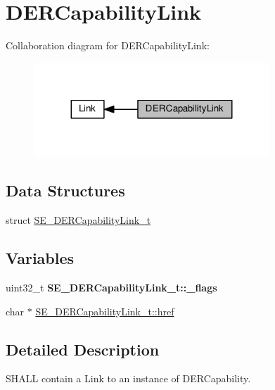 \hypertarget{group__DERCapabilityLink}{}\section{D\+E\+R\+Capability\+Link}
\label{group__DERCapabilityLink}
Collaboration diagram for D\+E\+R\+Capability\+Link\+:\nopagebreak
\begin{figure}[H]
\begin{center}
\leavevmode
\includegraphics[width=251pt]{group__DERCapabilityLink}
\end{center}
\end{figure}
\subsection*{Data Structures}
\begin{DoxyCompactItemize}
\item 
struct \hyperlink{structSE__DERCapabilityLink__t}{S\+E\+\_\+\+D\+E\+R\+Capability\+Link\+\_\+t}
\end{DoxyCompactItemize}
\subsection*{Variables}
\begin{DoxyCompactItemize}
\item 
\mbox{\label{group__DERCapabilityLink_gaea1b866e247ee0f3eb4085fe21918cc9}} 
uint32\+\_\+t {\bfseries S\+E\+\_\+\+D\+E\+R\+Capability\+Link\+\_\+t\+::\+\_\+flags}
\item 
char $\ast$ \hyperlink{group__DERCapabilityLink_ga70e58c8a8e494d1e297d78560d4c33e2}{S\+E\+\_\+\+D\+E\+R\+Capability\+Link\+\_\+t\+::href}
\end{DoxyCompactItemize}


\subsection{Detailed Description}
S\+H\+A\+LL contain a Link to an instance of D\+E\+R\+Capability. 

